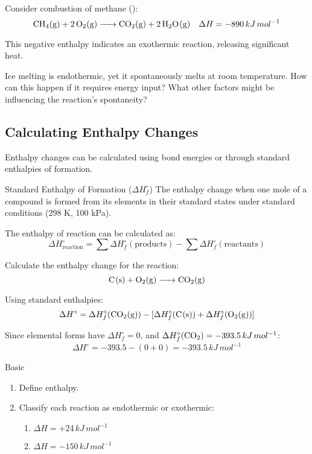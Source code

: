 \begin{example}
Consider combustion of methane ():
\[
\ce{CH4(g) + 2O2(g) -> CO2(g) + 2H2O(g)} \quad \Delta H = -890\,kJ\,mol^{-1}
\]

This negative enthalpy indicates an exothermic reaction, releasing significant heat.
\end{example}

\begin{stopandthink}
Ice melting is endothermic, yet it spontaneously melts at room temperature. How can this happen if it requires energy input? What other factors might be influencing the reaction's spontaneity?
\end{stopandthink}

\subsection{Calculating Enthalpy Changes}
\FloatBarrier
\FloatBarrier
\FloatBarrier

Enthalpy changes can be calculated using bond energies or through standard enthalpies of formation.

\begin{keyconcept}{Standard Enthalpy of Formation (\(\Delta H_f^\circ\))}
The enthalpy change when one mole of a compound is formed from its elements in their standard states under standard conditions (298 K, 100 kPa).
\end{keyconcept}

The enthalpy of reaction can be calculated as:
\[
\Delta H^\circ_{\text{reaction}} = \sum{\Delta H_f^\circ(\text{products})} - \sum{\Delta H_f^\circ(\text{reactants})}
\]

\begin{example}
Calculate the enthalpy change for the reaction:
\[
\ce{C(s) + O2(g) -> CO2(g)}
\]

Using standard enthalpies:
\[
\Delta H^\circ = \Delta H_f^\circ(\ce{CO2(g)}) - [\Delta H_f^\circ(\ce{C(s)}) + \Delta H_f^\circ(\ce{O2(g)})]
\]

Since elemental forms have \(\Delta H_f^\circ = 0\), and \(\Delta H_f^\circ(\ce{CO2}) = -393.5\,kJ\,mol^{-1}\):
\[
\Delta H^\circ = -393.5 - (0 + 0) = -393.5\,kJ\,mol^{-1}
\]
\end{example}

\begin{tieredquestions}{Basic}
\begin{enumerate}
    \item Define enthalpy.
    \item Classify each reaction as endothermic or exothermic:
    \begin{enumerate}
        \item \(\Delta H = +24\,kJ\,mol^{-1}\)
        \item \(\Delta H = -150\,kJ\,mol^{-1}\)
    \end{enumerate}
\end{enumerate}
\end{tieredquestions}

